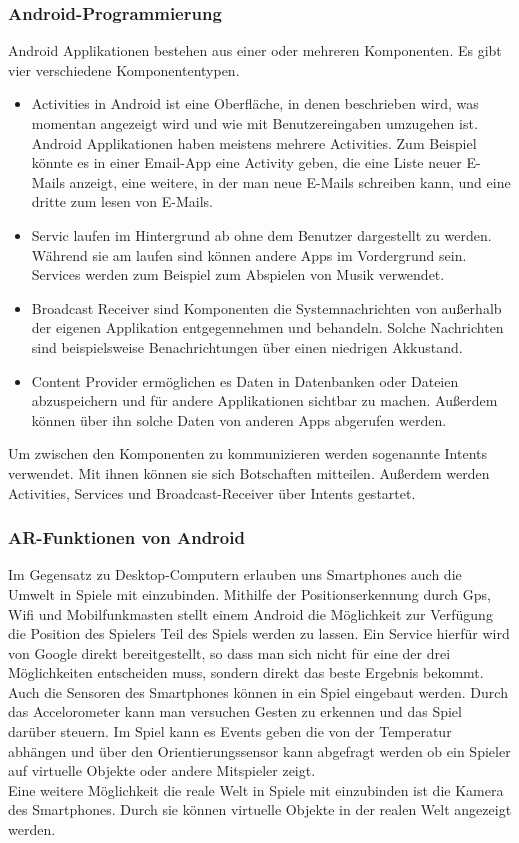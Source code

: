 \documentclass[extern,palatino]{cgBA}
\begin{document}
\subsubsection{Android-Programmierung}Android Applikationen bestehen aus einer oder  mehreren Komponenten. Es gibt vier verschiedene Komponententypen.
\begin{itemize}
	\item 
	 Activities in Android ist eine Oberfläche, in denen beschrieben wird, was momentan angezeigt wird und wie mit Benutzereingaben umzugehen ist. Android Applikationen haben meistens mehrere Activities. Zum Beispiel könnte es in einer Email-App eine Activity geben, die eine Liste neuer E-Mails anzeigt, eine weitere, in der man neue E-Mails schreiben kann, und eine dritte zum lesen von E-Mails. 
	 \item
	 Servic laufen im Hintergrund ab ohne dem Benutzer dargestellt zu werden. Während sie am laufen sind können andere Apps im Vordergrund sein. Services werden zum Beispiel zum  Abspielen von Musik verwendet.
	 \item Broadcast Receiver sind Komponenten die Systemnachrichten von außerhalb der eigenen Applikation entgegennehmen und behandeln. Solche Nachrichten sind beispielsweise Benachrichtungen über einen niedrigen Akkustand.
	 \item Content Provider ermöglichen es Daten in Datenbanken oder Dateien abzuspeichern und für andere Applikationen sichtbar zu machen. Außerdem können über ihn solche Daten von anderen Apps abgerufen werden.
\end{itemize}
Um zwischen den Komponenten zu kommunizieren werden sogenannte Intents verwendet. Mit ihnen können sie sich Botschaften mitteilen. Außerdem werden Activities, Services und Broadcast-Receiver über Intents gestartet.
\subsubsection{AR-Funktionen von Android}
Im Gegensatz zu Desktop-Computern erlauben uns Smartphones auch die Umwelt in Spiele mit einzubinden. Mithilfe der Positionserkennung durch Gps, Wifi und Mobilfunkmasten stellt einem Android die Möglichkeit zur Verfügung die Position des Spielers Teil des Spiels werden zu lassen. Ein Service hierfür wird von Google direkt bereitgestellt, so dass man sich nicht für eine der drei Möglichkeiten entscheiden muss, sondern direkt das beste Ergebnis bekommt.\\
Auch die Sensoren des Smartphones können in ein Spiel eingebaut werden. Durch das Accelorometer kann man versuchen Gesten zu erkennen und das Spiel darüber steuern. Im Spiel kann es Events geben die von der Temperatur abhängen und über den Orientierungssensor kann abgefragt werden ob ein Spieler auf virtuelle Objekte oder andere Mitspieler zeigt.\\
Eine weitere Möglichkeit die reale Welt in Spiele mit einzubinden ist die Kamera des Smartphones. Durch sie können virtuelle Objekte in der realen Welt angezeigt werden. 
\end{document}
